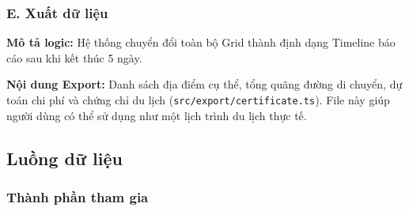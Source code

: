 \subsubsection{E. Xuất dữ liệu}

\textbf{Mô tả logic:} Hệ thống chuyển đổi toàn bộ Grid thành định dạng Timeline báo cáo sau khi kết thúc 5 ngày.

\textbf{Nội dung Export:} Danh sách địa điểm cụ thể, tổng quãng đường di chuyển, dự toán chi phí và chứng chỉ du lịch (\texttt{src/export/certificate.ts}). File này giúp người dùng có thể sử dụng như một lịch trình du lịch thực tế.
    
\newpage

\subsection{Luồng dữ liệu}

\subsubsection{Thành phần tham gia}

